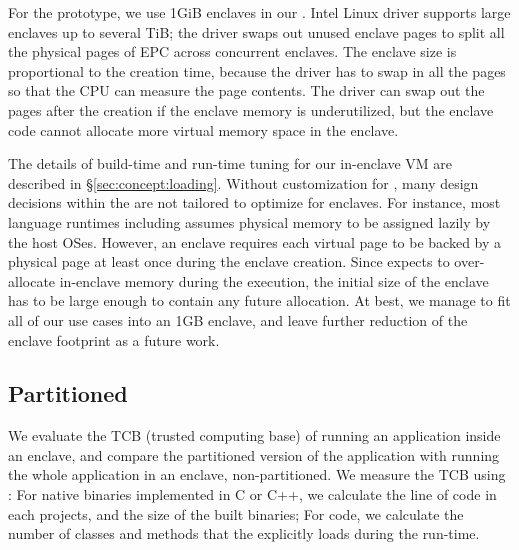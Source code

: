 For the prototype, we use 1GiB enclaves in our \dynamicframework{}.
Intel{} \sgx{} Linux driver supports large
enclaves up to several TiB;
the driver swaps out unused enclave pages
to split all the physical pages of EPC across concurrent enclaves.  
The enclave size is proportional to the creation time,
because the driver has to swap in all the pages so that the CPU can measure the page contents.
The driver can swap out the pages after the creation if the enclave memory is underutilized, but the enclave code cannot allocate more virtual memory space in the enclave.


The details of build-time and run-time tuning for our in-enclave VM are described in \S\ref{sec:concept:loading}.
Without customization for \sgx{},
many design decisions within the \jvmname{} \jvm{} are not tailored to optimize for enclaves.
For instance, most language runtimes including \jvmname{} assumes physical memory
to be assigned lazily by the host OSes.
However, an \sgx{} enclave requires each virtual page to be backed by a physical page at least once during the enclave creation.  
Since \jvmname{} expects to over-allocate in-enclave
memory during the execution,
the initial size of the enclave has to be large enough to contain any future allocation.
At best, we manage to fit all of our use cases into an 1GB enclave,
and leave further reduction of the enclave footprint as a future work.




\subsection{Partitioned \tcbsize{}}

We evaluate the TCB (trusted computing base) of running an \java{} application
inside an enclave,
and compare the partitioned version of the application
with running the whole application in an enclave, non-partitioned.
We measure the TCB using \emph{\tcbsize}:
For native binaries implemented in C or C++, we calculate the line of code in each projects, and the size of the built binaries;
For \java{} code, we calculate the number of classes and methods that the \jvm{} explicitly loads during the run-time.


